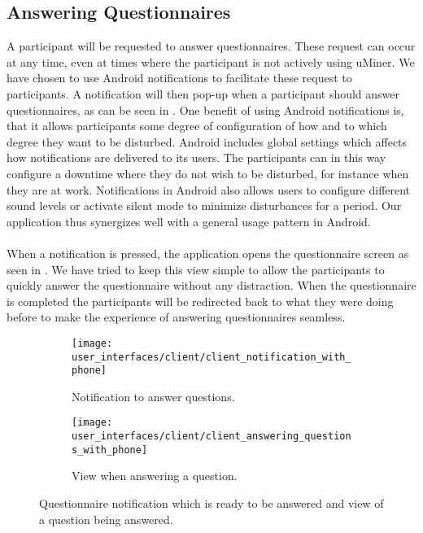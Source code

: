 \subsection{Answering Questionnaires}
\label{sub:answering_questionnaired}
A participant will be requested to answer questionnaires. These request can occur at any time, even at times where the participant is not actively using uMiner. We have chosen to use Android notifications \parencite{android_notifications} to facilitate these request to participants. A notification will then pop-up when a participant should answer questionnaires, as can be seen in . One benefit of using Android notifications is, that it allows participants some degree of configuration of how and to which degree they want to be disturbed. Android includes global settings which affects how notifications are delivered to its users. The participants can in this way configure a downtime where they do not wish to be disturbed, for instance when they are at work. Notifications in Android also allows users to configure different sound levels or activate silent mode to minimize disturbances for a period. Our application thus synergizes well with a general usage pattern in Android.     
\\\\
When a notification is pressed, the application opens the questionnaire screen as seen in . We have tried to keep this view simple to allow the participants to quickly answer the questionnaire without any distraction. When the questionnaire is completed the participants will be redirected back to what they were doing before to make the experience of answering questionnaires seamless. 
\begin{figure}[!htbp]
    \begin{subfigure}[!t]{.50\textwidth}
        \centering
        \texttt{[image: user\_interfaces/client/client\_notification\_with\_phone]}
        \caption{Notification to answer questions.}
        \label{fig:answering_questionnaire_notification}
    \end{subfigure}%
    \begin{subfigure}[!t]{.50\textwidth}
        \centering
        \texttt{[image: user\_interfaces/client/client\_answering\_questions\_with\_phone]}
        \caption{View when answering a question.}
        \label{fig:answering_questionnaire_answering}
    \end{subfigure}
    \caption{Questionnaire notification which is ready to be answered and view of a question being answered.}
    \label{fig:answering_questionnaire}
\end{figure}
\FloatBarrier

